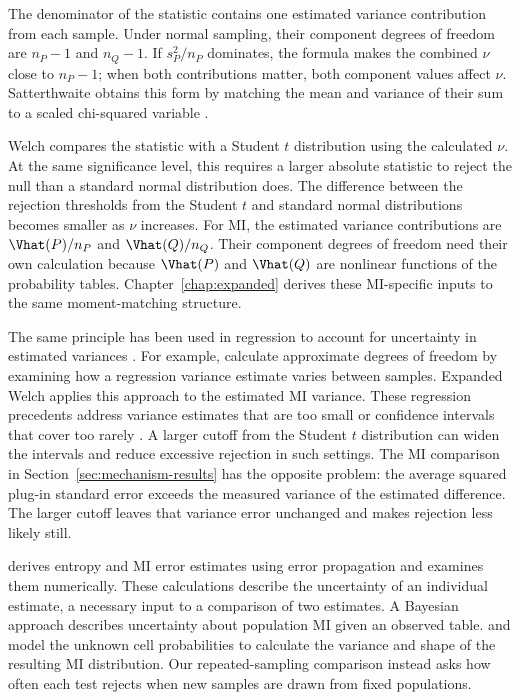 The denominator of the statistic contains one estimated variance contribution
from each sample. Under normal sampling, their component degrees of freedom
are \(n_P-1\) and \(n_Q-1\). If \(s_P^2/n_P\) dominates, the formula makes the
combined \(\nu\) close to \(n_P-1\); when both contributions matter, both
component values affect \(\nu\). Satterthwaite obtains this form by matching
the mean and variance of their sum to a scaled chi-squared variable
\citep{satterthwaite1946}.

Welch compares the statistic with a Student \(t\) distribution using the calculated
\(\nu\). At the same significance level, this requires a larger absolute
statistic to reject the null than a standard normal distribution does.
The difference between the rejection thresholds from the Student \(t\)
and standard normal distributions becomes
smaller as \(\nu\) increases.
For MI, the estimated variance contributions are \(\Vhat(P)/n_P\) and
\(\Vhat(Q)/n_Q\). Their component degrees of freedom need their own
calculation because \(\Vhat(P)\) and \(\Vhat(Q)\) are nonlinear functions of
the probability tables. Chapter~\ref{chap:expanded} derives these
MI-specific inputs to the same moment-matching structure.

The same principle has been used in regression to account for
uncertainty in estimated variances
\citep{panwall2002,bell2002,kauermann2001,fay2001,imbens2016}.
For example, \citet{panwall2002} calculate approximate degrees of freedom
by examining how a regression variance estimate varies between samples.
Expanded Welch applies this approach to the estimated MI variance.
These regression precedents address variance estimates that are too small
or confidence intervals that cover too rarely
\citep{bell2002,kauermann2001}. A larger cutoff from the Student \(t\)
distribution can widen the intervals and reduce excessive rejection in such
settings. The MI comparison in Section~\ref{sec:mechanism-results} has the
opposite problem: the average squared plug-in standard error exceeds the
measured variance of the estimated difference. The larger cutoff leaves
that variance error unchanged and makes rejection less likely still.

\medskip
{}

\citet{roulston1999} derives entropy and MI error estimates
using error propagation and examines them numerically. These calculations
describe the uncertainty of an individual estimate, a necessary input to a
comparison of two estimates.
A Bayesian approach describes uncertainty about population MI given an
observed table. \citet{hutter2002} and \citet{hutterzaffalon2005} model the
unknown cell probabilities to calculate the variance and shape of the
resulting MI distribution. Our repeated-sampling comparison instead asks
how often each test rejects when new samples are drawn from fixed
populations.

